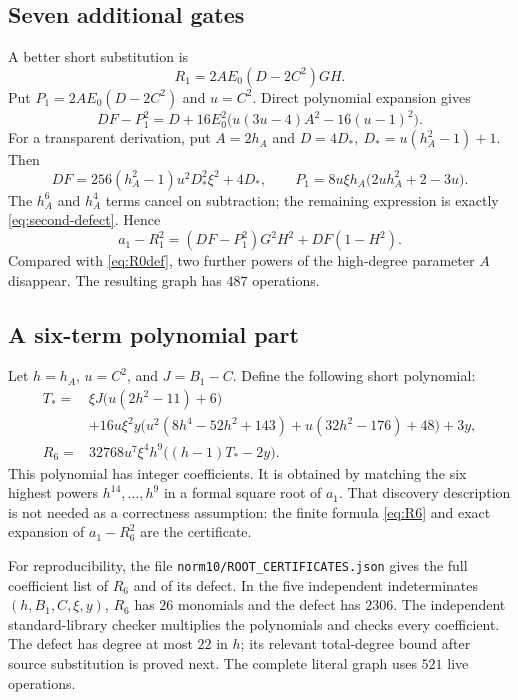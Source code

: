 \documentclass[11pt]{article}
\theoremstyle{definition}
\theoremstyle{remark}
\newcommand{\file}[1]{\nolinkurl{#1}}
\begin{document}
\subsection{Seven additional gates}

A better short substitution is
\begin{equation}\label{eq:R1}
 R_1=2AE_0(D-2C^2)GH.
\end{equation}
Put $P_1=2AE_0(D-2C^2)$ and $u=C^2$. Direct polynomial expansion gives
\begin{equation}\label{eq:second-defect}
 DF-P_1^2
 =D+16E_0^2\bigl(u(3u-4)A^2-16(u-1)^2\bigr).
\end{equation}
For a transparent derivation, put $A=2h_A$ and
$D=4D_*\!,\ D_*=u(h_A^2-1)+1$. Then
\[
 DF=256(h_A^2-1)u^2D_*^2\xi^2+4D_*,\qquad
 P_1=8u\xi h_A\bigl(2uh_A^2+2-3u\bigr).
\]
The $h_A^6$ and $h_A^4$ terms cancel on subtraction; the remaining
expression is exactly \eqref{eq:second-defect}. Hence
\begin{equation}\label{eq:R1def}
 a_1-R_1^2=(DF-P_1^2)G^2H^2+DF(1-H^2).
\end{equation}
Compared with \eqref{eq:R0def}, two further powers of the high-degree
parameter $A$ disappear. The resulting graph has $487$ operations.

\subsection{A six-term polynomial part}

Let $h=h_A$, $u=C^2$, and $J=B_1-C$. Define the following short polynomial:
\begin{align}
 T_*={}&\xi J\bigl(u(2h^2-11)+6\bigr)\nonumber\\
 &+16u\xi^2y\bigl(u^2(8h^4-52h^2+143)
                 +u(32h^2-176)+48\bigr)+3y,\label{eq:Tstar}\\
 R_6={}&32768u^7\xi^4h^9\bigl((h-1)T_*-2y\bigr).
 \label{eq:R6}
\end{align}
This polynomial has integer coefficients. It is obtained by matching the
six highest powers $h^{14},\ldots,h^9$ in a formal square root of $a_1$.
That discovery description is not needed as a correctness assumption:
the finite formula \eqref{eq:R6} and exact expansion of $a_1-R_6^2$ are
the certificate.

For reproducibility, the file \file{norm10/ROOT_CERTIFICATES.json}
gives the full coefficient list of $R_6$ and of its defect. In the five
independent indeterminates $(h,B_1,C,\xi,y)$, $R_6$ has $26$ monomials and
the defect has $2306$. The independent standard-library checker multiplies
the polynomials and checks every coefficient. The defect has degree at
most $22$ in $h$; its relevant total-degree bound after source substitution
is proved next. The complete literal graph uses $521$ live operations.
\end{document}
